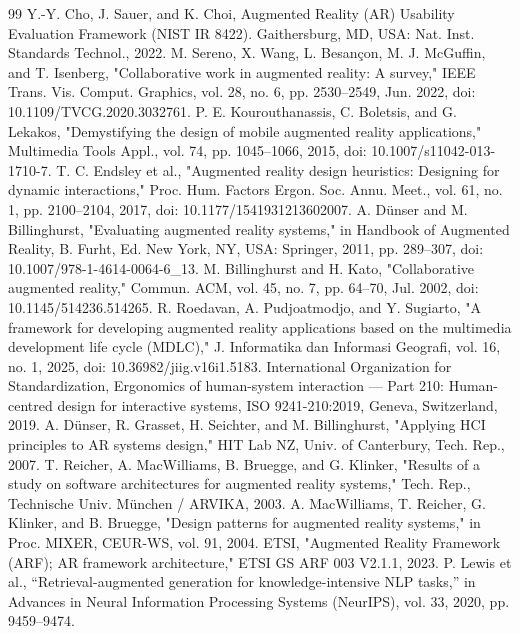\documentclass[conference]{IEEEtran}
\begin{document}
\begin{thebibliography}{99}
 Y.-Y. Cho, J. Sauer, and K. Choi, Augmented Reality (AR) Usability Evaluation Framework (NIST IR 8422). Gaithersburg, MD, USA: Nat. Inst. Standards Technol., 2022.
 M. Sereno, X. Wang, L. Besançon, M. J. McGuffin, and T. Isenberg, "Collaborative work in augmented reality: A survey," IEEE Trans. Vis. Comput. Graphics, vol. 28, no. 6, pp. 2530–2549, Jun. 2022, doi: 10.1109/TVCG.2020.3032761.
 P. E. Kourouthanassis, C. Boletsis, and G. Lekakos, "Demystifying the design of mobile augmented reality applications," Multimedia Tools Appl., vol. 74, pp. 1045–1066, 2015, doi: 10.1007/s11042-013-1710-7.
 T. C. Endsley et al., "Augmented reality design heuristics: Designing for dynamic interactions," Proc. Hum. Factors Ergon. Soc. Annu. Meet., vol. 61, no. 1, pp. 2100–2104, 2017, doi: 10.1177/1541931213602007.
 A. Dünser and M. Billinghurst, "Evaluating augmented reality systems," in Handbook of Augmented Reality, B. Furht, Ed. New York, NY, USA: Springer, 2011, pp. 289–307, doi: 10.1007/978-1-4614-0064-6\_13.
 M. Billinghurst and H. Kato, "Collaborative augmented reality," Commun. ACM, vol. 45, no. 7, pp. 64–70, Jul. 2002, doi: 10.1145/514236.514265.
 R. Roedavan, A. Pudjoatmodjo, and Y. Sugiarto, "A framework for developing augmented reality applications based on the multimedia development life cycle (MDLC)," J. Informatika dan Informasi Geografi, vol. 16, no. 1, 2025, doi: 10.36982/jiig.v16i1.5183.
 International Organization for Standardization, Ergonomics of human-system interaction — Part 210: Human-centred design for interactive systems, ISO 9241-210:2019, Geneva, Switzerland, 2019.
 A. Dünser, R. Grasset, H. Seichter, and M. Billinghurst, "Applying HCI principles to AR systems design," HIT Lab NZ, Univ. of Canterbury, Tech. Rep., 2007.
 T. Reicher, A. MacWilliams, B. Bruegge, and G. Klinker, "Results of a study on software architectures for augmented reality systems," Tech. Rep., Technische Univ. München / ARVIKA, 2003.
 A. MacWilliams, T. Reicher, G. Klinker, and B. Bruegge, "Design patterns for augmented reality systems," in Proc. MIXER, CEUR-WS, vol. 91, 2004.
 ETSI, "Augmented Reality Framework (ARF); AR framework architecture," ETSI GS ARF 003 V2.1.1, 2023.
 P. Lewis et al., ``Retrieval-augmented generation for knowledge-intensive NLP tasks,'' in Advances in Neural Information Processing Systems (NeurIPS), vol. 33, 2020, pp. 9459–9474.

\end{thebibliography}
\end{document}
